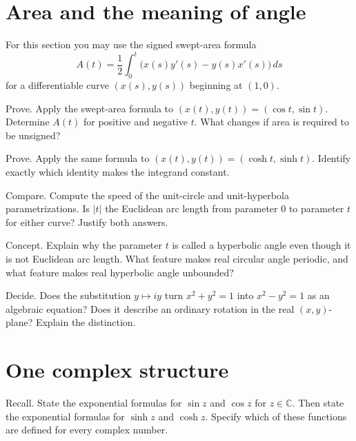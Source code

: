 \documentclass{workbook}
\newcommand{\C}{\mathbb{C}}
\begin{document}
\section{Area and the meaning of angle}

\medskip\noindent
For this section you may use the signed swept-area formula
\[
  A(t)=\frac12\int_0^t
  \bigl(x(s)y'(s)-y(s)x'(s)\bigr)\,ds
\]
for a differentiable curve $(x(s),y(s))$ beginning at $(1,0)$.

\begin{problem}{Prove.}
Apply the swept-area formula to
$(x(t),y(t))=(\cos t,\sin t)$. Determine $A(t)$ for positive and
negative $t$. What changes if area is required to be unsigned?
\end{problem}

\begin{problem}{Prove.}
Apply the same formula to
$(x(t),y(t))=(\cosh t,\sinh t)$. Identify exactly which identity
makes the integrand constant.
\end{problem}

\begin{problem}{Compare.}
Compute the speed of the unit-circle and unit-hyperbola
parametrizations. Is $|t|$ the Euclidean arc length from parameter $0$
to parameter $t$ for either curve? Justify both answers.
\end{problem}

\begin{problem}{Concept.}
Explain why the parameter $t$ is called a hyperbolic angle even though
it is not Euclidean arc length. What feature makes real circular angle
periodic, and what feature makes real hyperbolic angle unbounded?
\end{problem}

\begin{problem}{Decide.}
Does the substitution $y\mapsto iy$ turn $x^2+y^2=1$ into
$x^2-y^2=1$ as an algebraic equation? Does it describe an ordinary
rotation in the real $(x,y)$-plane? Explain the distinction.
\end{problem}

\section{One complex structure}

\begin{problem}{Recall.}
State the exponential formulas for $\sin z$ and $\cos z$ for
$z\in\C$. Then state the exponential formulas for $\sinh z$ and
$\cosh z$. Specify which of these functions are defined for every
complex number.
\end{problem}
\end{document}
